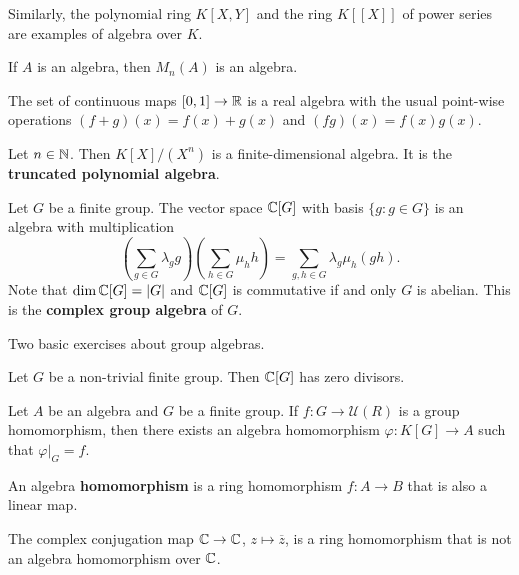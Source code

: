 Similarly, the polynomial ring $K[X,Y]$ and the ring $K[[X]]$ of power series
are examples of algebra over $K$. 

\begin{example}
	If $A$ is an algebra, then  $M_n(A)$ is an algebra. 
\end{example}

\begin{example}
	The set of continuous maps $[0,1]\to\mathbb{R}$ is a real algebra with the usual
	point-wise operations $(f+g)(x)=f(x)+g(x)$ and $(fg)(x)=f(x)g(x)$. 
\end{example}

\begin{example}
    Let $n\in\mathbb{N}$. Then $K[X]/(X^n)$ is a finite-dimensional algebra. 
    It is the \textbf{truncated polynomial algebra}.  
\end{example}

\begin{example}
	Let $G$ be a finite group. The vector space 
	$\mathbb{C}[G]$ with basis $\{g:g\in G\}$
	is an algebra with multiplication
	\[
	\left(\sum_{g\in G}\lambda_gg\right)\left(\sum_{h\in G}\mu_hh\right)
	=\sum_{g,h\in G}\lambda_g\mu_h(gh).
	\] 	
	Note that $\dim\mathbb{C}[G]=|G|$ and
	$\mathbb{C}[G]$ is commutative if and only $G$ is abelian. 
	This is the \textbf{complex group algebra} of $G$. 
\end{example}

Two basic exercises about group algebras.
 
\begin{exercise}
	Let $G$ be a non-trivial finite group. 
	Then $\mathbb{C}[G]$ has zero divisors. 
\end{exercise}

\begin{exercise}
	Let $A$ be an algebra and $G$ be a finite group. 
	If $f\colon G\to\mathcal{U}(R)$ is a group homomorphism, 
	then there exists an algebra homomorphism 
	$\varphi\colon K[G]\to A$ such that $\varphi|_G=f$.   	
\end{exercise}

\begin{definition}
    An algebra \textbf{homomorphism} is a ring homomorphism $f\colon A\to B$ that is also a linear map. 
\end{definition}

The complex conjugation map  
$\mathbb{C}\to \mathbb{C}$, $z\mapsto\overline{z}$, is a ring homomorphism that is not an algebra homomorphism over $\mathbb{C}$. 

